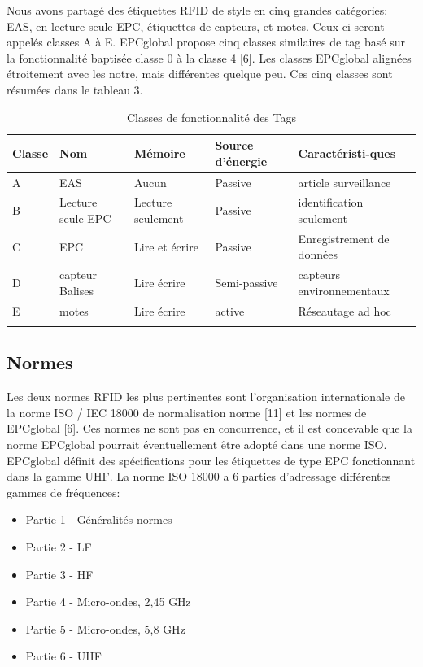 \documentclass[11pt, a4paper, twoside]{book}
\begin{document}
Nous avons partagé des étiquettes RFID de style en cinq grandes catégories: EAS, en lecture seule EPC, étiquettes de capteurs, et motes. Ceux-ci seront appelés classes A à E. EPCglobal propose cinq classes similaires de tag basé sur la fonctionnalité baptisée classe 0 à la classe 4 [6]. Les classes EPCglobal alignées étroitement avec les notre, mais différentes quelque peu. Ces cinq classes sont résumées dans le tableau 3.

\begin{longtable}{|p{}|p{}|p{}| p{}|p{}|}
\hline
\textbf{Classe} & \textbf{Nom} & \textbf{Mémoire} & \textbf{Source d'énergie} & \textbf{Caractéristi-ques} \\
\hline
A & EAS & Aucun & Passive & article surveillance \\
\hline
B & Lecture seule EPC & Lecture seulement & Passive & identification seulement \\
\hline
C & EPC & Lire et écrire & Passive & Enregistrement de données \\
\hline
D & capteur Balises & Lire écrire & Semi-passive & capteurs environnementaux \\
\hline
E & motes & Lire écrire & active & Réseautage ad hoc \\
\hline
\caption{Classes de fonctionnalité des Tags}
\end{longtable}

\subsection{Normes}

Les deux normes RFID les plus pertinentes sont l'organisation internationale de la norme ISO / IEC 18000 de normalisation norme [11] et les normes de EPCglobal [6]. Ces normes ne sont pas en concurrence, et il est concevable que la norme EPCglobal pourrait éventuellement être adopté dans une norme ISO.
EPCglobal définit des spécifications pour les étiquettes de type EPC fonctionnant dans la gamme UHF.
La norme ISO 18000 a 6 parties d'adressage différentes gammes de fréquences:
\begin{itemize}
\item Partie 1 - Généralités normes
\item Partie 2 - LF
\item Partie 3 - HF
\item Partie 4 - Micro-ondes, 2,45 GHz
\item Partie 5 - Micro-ondes, 5,8 GHz
\item Partie 6 - UHF\\
\end{itemize}
\end{document}
